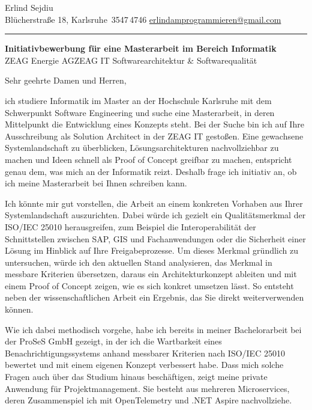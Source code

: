 \documentclass[a4paper,11pt]{article}
\newcommand{\firma}{ZEAG Energie AG}
\begin{document}
{\LARGE Erlind Sejdiu}\\[0.3em]
{\small\color{muted}
Blücherstraße 18, Karlsruhe \enspace\textbar{}\,3547\,4746 \enspace\textbar\enspace
\href{mailto:erlindamprogrammieren@gmail.com}{erlindamprogrammieren@gmail.com}}\\[0.4em]
\textcolor{hairline}{\rule{\linewidth}{0.7pt}}

\vspace{0.9em}

{\large\textbf{Initiativbewerbung für eine Masterarbeit im Bereich Informatik}}\\[0.15em]
{\small\color{muted}\firma \enspace\textbar\enspace ZEAG IT \enspace\textbar\enspace Softwarearchitektur \& Softwarequalität}

\vspace{0.4em}

Sehr geehrte Damen und Herren,

ich studiere Informatik im Master an der Hochschule Karlsruhe mit dem Schwerpunkt Software Engineering und suche eine Masterarbeit, in deren Mittelpunkt die Entwicklung eines Konzepts steht. Bei der Suche bin ich auf Ihre Ausschreibung als Solution Architect in der ZEAG IT gestoßen. Eine gewachsene Systemlandschaft zu überblicken, Lösungsarchitekturen nachvollziehbar zu machen und Ideen schnell als Proof of Concept greifbar zu machen, entspricht genau dem, was mich an der Informatik reizt. Deshalb frage ich initiativ an, ob ich meine Masterarbeit bei Ihnen schreiben kann.

Ich könnte mir gut vorstellen, die Arbeit an einem konkreten Vorhaben aus Ihrer Systemlandschaft auszurichten. Dabei würde ich gezielt ein Qualitätsmerkmal der ISO/IEC 25010 herausgreifen, zum Beispiel die Interoperabilität der Schnittstellen zwischen SAP, GIS und Fachanwendungen oder die Sicherheit einer Lösung im Hinblick auf Ihre Freigabeprozesse. Um dieses Merkmal gründlich zu untersuchen, würde ich den aktuellen Stand analysieren, das Merkmal in messbare Kriterien übersetzen, daraus ein Architekturkonzept ableiten und mit einem Proof of Concept zeigen, wie es sich konkret umsetzen lässt. So entsteht neben der wissenschaftlichen Arbeit ein Ergebnis, das Sie direkt weiterverwenden können.

Wie ich dabei methodisch vorgehe, habe ich bereits in meiner Bachelorarbeit bei der ProSeS GmbH gezeigt, in der ich die Wartbarkeit eines Benachrichtigungssystems anhand messbarer Kriterien nach ISO/IEC 25010 bewertet und mit einem eigenen Konzept verbessert habe. Dass mich solche Fragen auch über das Studium hinaus beschäftigen, zeigt meine private Anwendung für Projektmanagement. Sie besteht aus mehreren Microservices, deren Zusammenspiel ich mit OpenTelemetry und .NET Aspire nachvollziehe.
\end{document}
